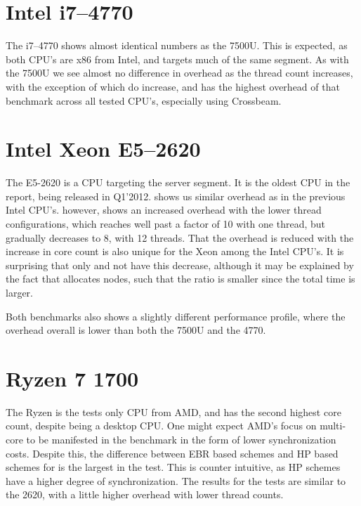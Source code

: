 \documentclass[b5paper]{report}
\begin{document}

\clearpage
\section{Intel\textregistered{} i7--4770}

The i7--4770 shows almost identical numbers as the 7500U. This is expected, as
both CPU's are x86 from Intel, and targets much of the same segment. As with the
7500U we see almost no difference in overhead as the thread count increases,
with the exception of  which do increase, and has the highest
overhead of that benchmark across all tested CPU's, especially using
Crossbeam.


\clearpage
\section{Intel\textregistered{} Xeon\textregistered{} E5--2620}

The E5-2620 is a CPU targeting the server segment. It is the oldest CPU in the
report, being released in Q1'2012.  shows us similar overhead as in
the previous Intel CPU's.  however, shows an increased overhead
with the lower thread configurations, which reaches well past a factor of 10 with
one thread, but gradually decreases to 8, with 12 threads. That the overhead is
reduced with the increase in core count is also unique for the Xeon among the
Intel CPU's. It is surprising that only  and not  have
this decrease, although it may be explained by the fact that 
allocates nodes, such that the ratio is smaller since the total time is larger.

Both  benchmarks also shows a slightly different performance profile,
where the overhead overall is lower than both the 7500U and the 4770.


\clearpage
\section{Ryzen 7 1700}

The Ryzen is the tests only CPU from AMD, and has the second highest core count,
despite being a desktop CPU. One might expect AMD's focus on multi-core to
be manifested in the benchmark in the form of lower synchronization costs.
Despite this, the difference between EBR based schemes and HP based schemes for
is the largest in the test. This is counter intuitive, as HP schemes
have a higher degree of synchronization. The results for the  tests
are similar to the 2620, with a little higher overhead with lower thread counts.
\end{document}
